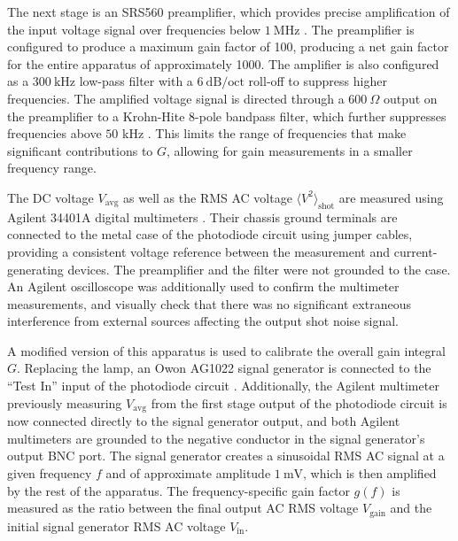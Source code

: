 \documentclass[aps,twocolumn,secnumarabic,balancelastpage,amsmath,amssymb,nofootinbib,floatfix]{revtex4-1}
\begin{document}
The next stage is an SRS560 preamplifier, which provides precise amplification of the input voltage signal over frequencies below $1 \ \text{MHz}$ \cite{stanford_research_systems_sr560}. The preamplifier is configured to produce a maximum gain factor of 100, producing a net gain factor for the entire apparatus of approximately 1000. The amplifier is also configured as a $300 \  \text{kHz}$ low-pass filter with a $6 \ \text{dB/oct}$ roll-off to suppress higher frequencies. The amplified voltage signal is directed through a $600\ \Omega$ output on the preamplifier to a Krohn-Hite 8-pole bandpass filter, which further suppresses frequencies above $50$ kHz \cite{mit_johnson_shot_noise_2023}. This limits the range of frequencies that make significant contributions to $G$, allowing for gain measurements in a smaller frequency range.

The DC voltage $V_{\text{avg}}$ as well as the RMS AC voltage $\langle V ^2\rangle_{\text{shot}}$ are  measured using Agilent 34401A digital multimeters \cite{hewlett_packard_34401a_users_guide_1996}. Their chassis ground terminals are connected to the metal case of the photodiode circuit using jumper cables, providing a consistent voltage reference between the measurement and current-generating devices. The preamplifier and the filter were not grounded to the case. An Agilent oscilloscope was additionally used to confirm the multimeter measurements, and visually check that there was no significant extraneous interference from external sources affecting the output shot noise signal.

A modified version of this apparatus is used to calibrate the overall gain integral $G$. Replacing the lamp, an Owon AG1022 signal generator is connected to the ``Test In'' input of the photodiode circuit \cite{owon_ag1022_ag1012_user_manual_2014}. Additionally, the Agilent multimeter previously measuring $V_{\text{avg}}$ from the first stage output of the photodiode circuit is now connected directly to the signal generator output, and both Agilent multimeters are grounded to the negative conductor in the signal generator's output BNC port. The signal generator creates a sinusoidal RMS AC signal at a given frequency $f$ and of approximate amplitude $1 \ \text{mV}$, which is then amplified by the rest of the apparatus. The frequency-specific gain factor $g(f)$ is measured as the ratio between the final output AC RMS voltage $V_{\text{gain}}$ and the initial signal generator RMS AC voltage  $V_{\text{in}}$.
\end{document}
